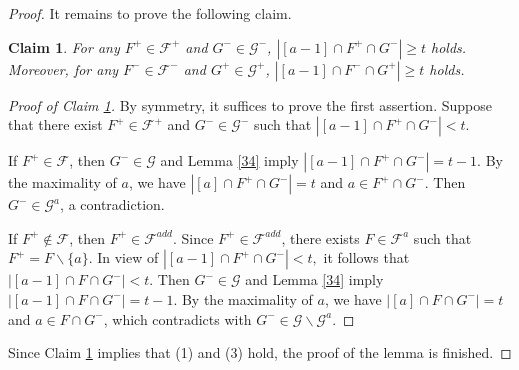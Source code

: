 \documentclass[11pt]{article}
\newtheorem{claim}{Claim}
\begin{document}
\begin{proof}
It remains  to prove the following claim. 
 \begin{claim}\label{cl2}
  For any $F^+\in\mathcal{F}^+$ and $G^-\in\mathcal{G}^-$, 
     $
    |[a-1] \cap F^+\cap G^-|\geq t
     $
     holds.
Moreover, for any $F^-\in\mathcal{F}^-$ and $G^+\in\mathcal{G}^+$, 
     $
    |[a-1] \cap F^-\cap G^+|\geq t
     $
     holds.
    \end{claim}
    \begin{proof}[Proof of Claim \ref{cl2}]
By symmetry, it suffices to prove the first assertion.
    Suppose that there exist $F^+\in\mathcal{F}^+$ and $G^-\in\mathcal{G}^-$ such that
     $
    |[a-1] \cap F^+\cap G^-|< t.
     $


  If $F^+\in\mathcal{F}$,  then $G^-\in\mathcal{G}$ and
Lemma \ref{34} imply $
    |[a-1] \cap F^+\cap G^-|=t-1.
     $
By the maximality of $a$, we have $
    |[a] \cap  F^+\cap G^-|=t
     $
and $a\in F^+\cap G^-$.
Then $ G^-\in \mathcal{G}^a$,  a contradiction.

If $F^+\notin\mathcal{F}$, then $F^+\in\mathcal{F}^{add}$.  Since  $F^+\in\mathcal{F}^{add}$, there exists 
 $F\in\mathcal{F}^a$ such that
        $ F^+=F\backslash \{a\}$.
In view of    $
          |[a-1] \cap  F^+\cap G^-|< t,
        $
it follows that
      $
        \left|[a-1]\cap F\cap G^- \right|<t.
       $
Then $G^-\in\mathcal{G}$ and
Lemma \ref{34} imply 
$
        \left|[a-1]\cap F\cap G^- \right|=t-1.
       $
By the maximality of $a$, we have $
    |[a] \cap F\cap G^-|=t
     $
and $a\in  F\cap G^-$,
       which contradicts with  $ G^-\in \mathcal{G}\backslash\mathcal{G}^a$.
    \end{proof}

Since  Claim \ref{cl2} implies that (1) and (3) hold, the proof of the lemma is finished. 
\end{proof}
\end{document}
